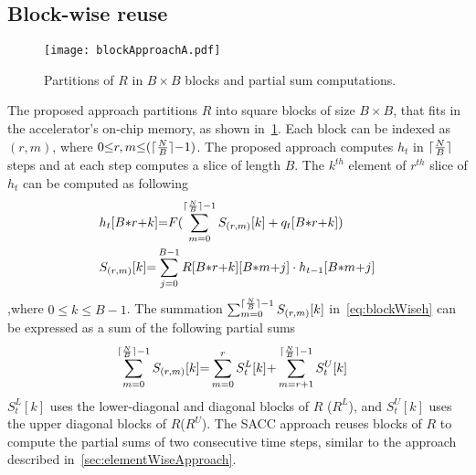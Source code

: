 \subsection{Block-wise reuse}
\begin{figure}[!tb]
	\centerline{\texttt{[image: blockApproachA.pdf]}}
	\caption{Partitions of $R$ in $B{\times}B$ blocks and partial sum computations.}
	\label{fig:blockApproach}
	\vspace{-1.0em}	
\end{figure}
The proposed approach partitions $R$ into square blocks of size $B{\times}B$, that fits in the accelerator's on-chip memory, as shown in~\figurename{\ref{fig:blockApproach}}. Each block can be indexed as $(r,m)$, where $0{\le}r,m{\le} (\lceil\frac{N}{B}\rceil{-}1)$. The proposed approach computes $h_t$ in $\lceil\frac{N}{B}\rceil$ steps and at each step computes a slice of length $B$. The $k^{th}$ element of $r^{th}$ slice of $h_{t}$ can be computed as following
\begin{align}
	&h_{t}[B{*}r{+}k]{=}F(\sum_{m{=}0}^{\lceil\frac{N}{B}\rceil{-}1}S_{(r,m)}[k]+q_{t}[B{*}r{+}k]) \label{eq:blockWiseh}\\
	&S_{(r,m)}[k]{=}\sum_{j=0}^{B{-}1}R[B{*}r{+}k][B{*}m{+}j]\cdot h_{t-1}[B{*}m{+}j] \label{eq:blockWiseSum}
\end{align}
,where $0{\le}k{\le}B{-}1$. The summation $\sum_{m{=}0}^{\lceil\frac{N}{B}\rceil{-}1}S_{(r,m)}[k]$ in~\eqref{eq:blockWiseh} can be expressed as a sum of the following partial sums
\begin{align}
	&\sum_{m{=}0}^{\lceil\frac{N}{B}\rceil{-}1}S_{(r,m)}[k]{=}\sum_{m{=}0}^{r}S_{t}^{L}[k]{+}\sum_{m{=}r{+}1}^{\lceil\frac{N}{B}\rceil{-}1}S_{t}^{U}[k] 
\end{align}
$S_{t}^{L}[k]$ uses the lower-diagonal and diagonal blocks of $R$ ($R^L$), and $S_{t}^{U}[k]$ uses the upper diagonal blocks of $R$($R^U$). The SACC approach reuses blocks of $R$ to compute the partial sums of two consecutive time steps, similar to the approach described in~\ref{sec:elementWiseApproach}. 

